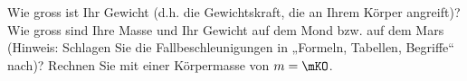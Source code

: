 Wie gross ist Ihr Gewicht (d.h. die Gewichtskraft, die an Ihrem Körper angreift)? Wie gross sind Ihre Masse und Ihr Gewicht auf dem Mond bzw. auf dem Mars (Hinweis: Schlagen Sie die Fallbeschleunigungen in „Formeln, Tabellen, Begriffe“ nach)? Rechnen Sie mit einer Körpermasse von $m = \mKO$.
